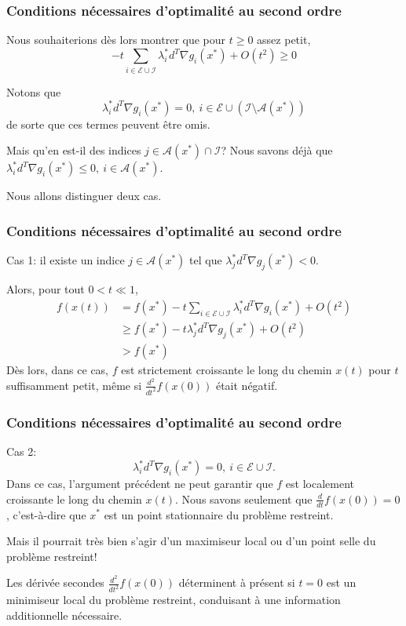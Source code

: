 \documentclass[usepdftitle=false]{beamer}
\def\cA{\mathcal{A}}
\def\cE{\mathcal{E}}
\def\cI{\mathcal{I}}
\begin{document}
\begin{frame}
\frametitle{Conditions nécessaires d'optimalité au second ordre}

Nous souhaiterions dès lors montrer que pour $t \geq 0$ assez petit,
$$
- t \sum_{i \in \cE \cup \cI} \lambda_i^* d^T \nabla g_i(x^*) + O(t^2) \geq 0
$$

Notons que
$$
\lambda_i^* d^T\nabla g_i(x^*) = 0,\ i \in \cE \cup (\cI \setminus \cA(x^*))
$$
de sorte que ces termes peuvent être omis.

\mbox{}

Mais qu'en est-il des indices $j \in \cA(x^*) \cap \cI$?
Nous savons déjà que $\lambda_i^* d^T\nabla g_i(x^*) \leq 0,\ i \in \cA(x^*)$.


Nous allons distinguer deux cas.

\end{frame}

\begin{frame}
\frametitle{Conditions nécessaires d'optimalité au second ordre}

Cas 1: il existe un indice $j \in \cA(x^*)$ tel que $\lambda_j^* d^T \nabla g_j(x^*) < 0$.

\mbox{}

Alors, pour tout $0 < t \ll 1$,
\begin{align*}
f(x(t))
&= f(x^*) - t \sum_{i \in \cE \cup \cI} \lambda_i^* d^T \nabla g_i(x^*) + O(t^2) \\
&\geq f(x^*) - t \lambda_j^* d^T \nabla g_j(x^*) + O(t^2) \\
&> f(x^*)
\end{align*}
Dès lors, dans ce cas, $f$ est strictement croissante le long du chemin $x(t)$ pour $t$ suffisamment petit, même si $\frac{d^2}{dt^2} f(x(0))$ était négatif.

\end{frame}

\begin{frame}
\frametitle{Conditions nécessaires d'optimalité au second ordre}

Cas 2:
$$
\lambda_i^* d^T \nabla g_i(x^*) = 0,\ i \in \cE \cup \cI. 
$$
Dans ce cas, l'argument précédent ne peut garantir que $f$ est localement croissante le long du chemin $x(t)$.
Nous savons seulement que $\frac{d}{dt} f(x(0)) = 0$, c'est-à-dire que $x^*$ est un point stationnaire du problème restreint.

\mbox{}

Mais il pourrait très bien s'agir d'un maximiseur local ou d'un point selle du problème restreint!

\mbox{}

Les dérivée secondes $\frac{d^2}{dt^2} f(x(0))$ déterminent à présent si $t = 0$ est un minimiseur local du problème restreint, conduisant à une information additionnelle nécessaire.

\end{frame}
\end{document}
